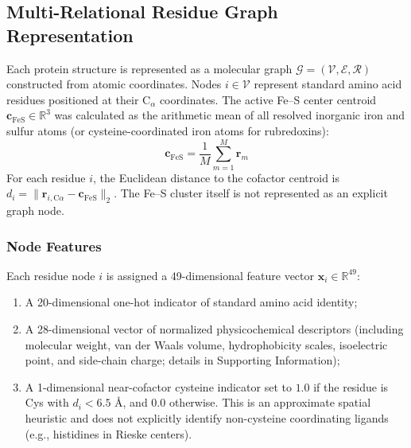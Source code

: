 \documentclass[journal=jcisd8,manuscript=article]{achemso}
\begin{document}
\subsection{Multi-Relational Residue Graph Representation}
Each protein structure is represented as a molecular graph $\mathcal{G} = (\mathcal{V}, \mathcal{E}, \mathcal{R})$ constructed from atomic coordinates. Nodes $i \in \mathcal{V}$ represent standard amino acid residues positioned at their $\text{C}_\alpha$ coordinates. The active Fe--S center centroid $\mathbf{c}_{\text{FeS}} \in \mathbb{R}^3$ was calculated as the arithmetic mean of all resolved inorganic iron and sulfur atoms (or cysteine-coordinated iron atoms for rubredoxins):
\begin{equation}
\mathbf{c}_{\text{FeS}} = \frac{1}{M} \sum_{m=1}^M \mathbf{r}_m
\end{equation}
For each residue $i$, the Euclidean distance to the cofactor centroid is $d_i = \|\mathbf{r}_{i,\text{C}\alpha} - \mathbf{c}_{\text{FeS}}\|_2$. The Fe--S cluster itself is not represented as an explicit graph node.

\subsubsection{Node Features}
Each residue node $i$ is assigned a 49-dimensional feature vector $\mathbf{x}_i \in \mathbb{R}^{49}$:
\begin{enumerate}
    \item A 20-dimensional one-hot indicator of standard amino acid identity;
    \item A 28-dimensional vector of normalized physicochemical descriptors (including molecular weight, van der Waals volume, hydrophobicity scales, isoelectric point, and side-chain charge; details in Supporting Information);
    \item A 1-dimensional near-cofactor cysteine indicator set to $1.0$ if the residue is Cys with $d_i < 6.5\text{ \AA}$, and $0.0$ otherwise. This is an approximate spatial heuristic and does not explicitly identify non-cysteine coordinating ligands (e.g., histidines in Rieske centers).
\end{enumerate}
\end{document}

